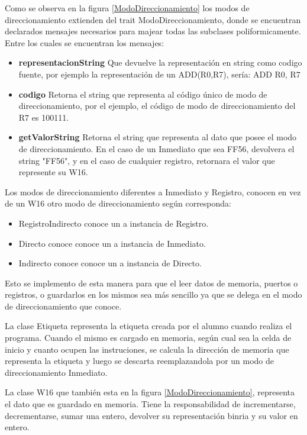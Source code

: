Como se observa en la figura \ref{ModoDireccionamiento} los modos de direccionamiento extienden del trait ModoDireccionamiento, donde se encuentran declarados mensajes necesarios para majear todas las subclases poliformicamente. Entre los cuales se encuentran los mensajes: 
\begin{itemize}
\item  \textbf{representacionString}
Que devuelve la representación en string como codigo fuente, por ejemplo la representación de un ADD(R0,R7), sería: ADD R0, R7
\item  \textbf{codigo}
Retorna el string que representa al código único de modo de direccionamiento, por el ejemplo, el código de modo de direccionamiento del R7 es 100111.
\item  \textbf{getValorString}
Retorna el string que representa al dato que posee el modo de direccionamiento. En el caso de un Inmediato que sea FF56, devolvera el string "FF56", y en el caso de cualquier registro, retornara el valor que represente su W16.
\end{itemize}
Los modos de direccionamiento diferentes a Inmediato y Registro, conocen en vez de un W16 otro modo de direccionamiento según corresponda:
\begin{itemize}
\item RegistroIndirecto conoce un a instancia de Registro.
\item Directo conoce conoce un a instancia de Inmediato.
\item Indirecto conoce conoce un a instancia de Directo.
\end{itemize}
Esto se implemento de esta manera para que el leer datos de memoria, puertos o registros, o guardarlos en los mismos sea más sencillo ya que se delega en el modo de direccionamiento que conoce.

La clase Etiqueta representa la etiqueta creada por el alumno cuando realiza el programa. Cuando el mismo es cargado en memoria, según cual sea la celda de inicio y cuanto ocupen las instruciones, se calcula la dirección de memoria que representa la etiqueta y luego se descarta reemplazandola por un modo de direccionamiento Inmediato.

La clase W16 que también esta en la figura \ref{ModoDireccionamiento}, representa el dato que es guardado en memoria. Tiene la responsabilidad de incrementarse, decrementarse, sumar una entero, devolver su representación binria y su valor en entero.



